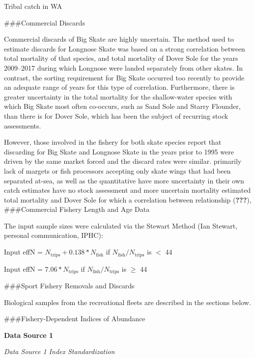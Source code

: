 \documentclass[12pt,]{article}
\begin{document}
Tribal catch in WA

\#\#\#Commercial Discards

Commercial discards of Big Skate are highly uncertain. The method used
to estimate discards for Longnose Skate was based on a strong
correlation between total mortality of that species, and total mortality
of Dover Sole for the years 2009--2017 during which Longnose were landed
separately from other skates. In contrast, the sorting requirement for
Big Skate occurred too recently to provide an adequate range of years
for this type of correlation. Furthermore, there is greater uncertainty
in the total mortality for the shallow-water species with which Big
Skate most often co-occurs, such as Sand Sole and Starry Flounder, than
there is for Dover Sole, which has been the subject of recurring stock
assessments.

However, those involved in the fishery for both skate species report
that discarding for Big Skate and Longnose Skate in the years prior to
1995 were driven by the same market forced and the discard rates were
similar. primarily lack of margets or fish processors accepting only
skate wings that had been separated at-sea, as well as the quantitative
have more uncertainty in their own catch estimates have no stock
assessment and more uncertain mortality estimated total mortality and
Dover Sole for which a correlation between relationship
({\textbf{???}}),\\
\#\#\#Commercial Fishery Length and Age Data

The input sample sizes were calculated via the Stewart Method (Ian
Stewart, personal communication, IPHC):

\begin{centering}

Input effN = $N_{\text{trips}} + 0.138 * N_{\text{fish}}$ if $N_{\text{fish}}/N_{\text{trips}}$ is $<$ 44

Input effN = $7.06 * N_{\text{trips}}$ if $N_{\text{fish}}/N_{\text{trips}}$ is $\geq$ 44

\end{centering}

\#\#\#Sport Fishery Removals and Discards

Biological samples from the recreational fleets are described in the
sections below.

\#\#\#Fishery-Dependent Indices of Abundance

\textbf{Data Source 1}

\emph{Data Source 1 Index Standardization}
\end{document}
